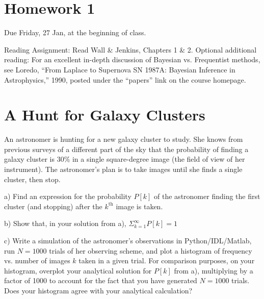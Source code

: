 \documentclass[11pt,letterpaper,notitlepage,onesided]{nwh_hw}
\begin{document}


\pagestyle{myheadings}

\section*{Homework 1}

Due Friday, 27 Jan, at the beginning of class. 


Reading Assignment: Read Wall \& Jenkins, Chapters 1 \& 2. Optional
additional reading: For an excellent in-depth discussion of Bayesian
vs. Frequentist methods, see Loredo, ``From Laplace to Supernova SN
1987A: Bayesian Inference in Astrophysics,'' 1990, posted under the
``papers'' link on the course homepage.


\section{A Hunt for Galaxy Clusters}

An astronomer is hunting for a new galaxy cluster to study. She knows
from previous surveys of a different part of the sky that the
probability of finding a galaxy cluster is 30\% in a single
square-degree image (the field of view of her instrument). The
astronomer's plan is to take images until she finds a single cluster,
then stop.

a) Find an expression for the probability $P[k]$ of the astronomer
finding the first cluster (and stopping) after the $k^\mathrm{th}$
image is taken.

b) Show that, in your solution from a), $\Sigma_{k=1}^{\infty} P[k] = 1$

c) Write a simulation of the astronomer's observations in Python/IDL/Matlab,
run $N=1000$ trials of her observing scheme, and plot a histogram of
frequency vs. number of images $k$ taken in a given trial. For
comparison purposes, on your histogram, overplot your analytical
solution for $P[k]$ from a), multiplying by a factor of 1000 to
account for the fact that you have generated $N=1000$ trials. Does
your histogram agree with your analytical calculation?
\end{document}
